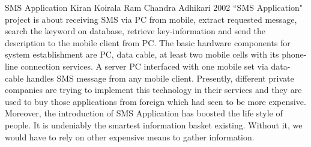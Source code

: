 \begin{conf-abstract}[]
{SMS Application}
{ 
Kiran Koirala
Ram Chandra Adhikari
}
{2002}
``SMS Application" project is about receiving SMS via PC from mobile, extract requested message, search the keyword on database, retrieve key-information and send the description to the mobile client from PC. The basic hardware components for system establishment are PC, data cable, at least two mobile cells with its phone-line connection services. A server PC interfaced with one mobile set via data-cable handles SMS message from any mobile client. Presently, different private companies are trying to implement this technology in their services and they are used to buy those applications from foreign which had seen to be more expensive. Moreover, the introduction of SMS Application has boosted the life style of people. It  is undeniably the smartest information basket existing. Without it, we would have to rely on other expensive means to gather information. 
\end{conf-abstract}	